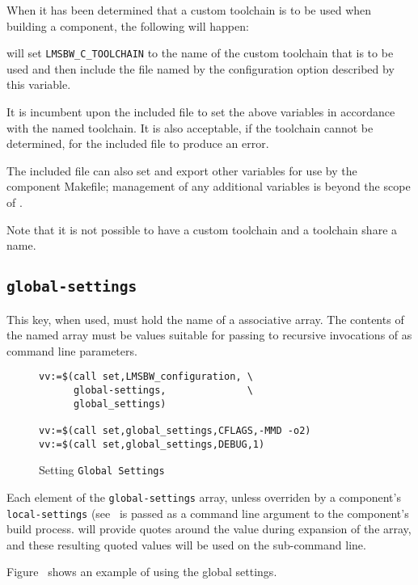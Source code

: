 When it has been determined that a custom toolchain is to be used when
building a component, the following will happen:

\lmsbw will set \texttt{LMSBW\_C\_TOOLCHAIN} to the name of the custom
toolchain that is to be used and then include the file named by the
configuration option described by this variable.

It is incumbent upon the included file to set the above variables in
accordance with the named toolchain.  It is also acceptable, if the
toolchain cannot be determined, for the included file to produce an
error.

The included file can also set and export other variables for use by
the component Makefile; management of any additional variables is
beyond the scope of \lmsbw.

Note that it is not possible to have a custom toolchain and a \ctng
toolchain share a name.

\subsection{\texttt{global-settings}}\label{variables:global-settings}

This key, when used, must hold the name of a \gmsl associative array.
The contents of the named array must be values suitable for passing to
recursive invocations of \make as command line parameters.

\begin{figure}
\hrulefill
\begin{verbatim}
vv:=$(call set,LMSBW_configuration, \
      global-settings,              \
      global_settings)

vv:=$(call set,global_settings,CFLAGS,-MMD -o2)
vv:=$(call set,global_settings,DEBUG,1)
\end{verbatim}
\hrulefill
\caption{Setting \texttt{Global Settings}}\label{variables:global-settings-example}
\end{figure}

Each element of the \texttt{global-settings} array, unless overriden
by a component's \texttt{local-settings}
(see~\xref{variables:local-settings} is passed as a command line
argument to the component's build process.  \lmsbw will provide quotes
around the value during expansion of the array, and these resulting
quoted values will be used on the sub-\make command line.

Figure~ shows an example of
using the global settings.

